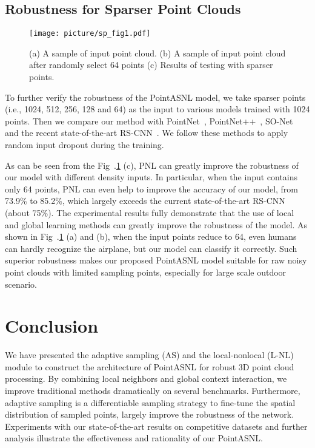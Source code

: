 \documentclass[10pt,twocolumn,letterpaper]{article}
\begin{document}
	\subsection{Robustness for Sparser Point Clouds}
	\begin{figure}[!tbp]
		\begin{center}
			\texttt{[image: picture/sp\_fig1.pdf]}
		\end{center}
		\caption{ { (a) A sample of input point cloud. (b)  A sample of input point cloud after randomly select 64 points (c) Results of testing with sparser points}. }
		\label{fig:sp_fig1}
		\vspace{-0.4cm}
	\end{figure}
	To further verify the robustness of the PointASNL model, we take sparser points (i.e., 1024, 512, 256, 128 and 64) as the input to various models trained with 1024 points. Then we compare our method with PointNet~\cite{pointnet}, PointNet++~\cite{pointnet2}, SO-Net~\cite{So-net} and the recent state-of-the-art RS-CNN~\cite{rscnn}. We follow these methods to apply random input dropout during the training.
	
	
	As can be seen from the Fig~.\ref{fig:sp_fig1} (c), PNL can greatly improve the robustness of our model with different density inputs. In particular, when the input contains only 64 points, PNL can even help to improve the accuracy of our model, from 73.9\% to 85.2\%, which largely exceeds the current state-of-the-art RS-CNN~\cite{rscnn} (about 75\%). The experimental results fully demonstrate that the use of local and global learning methods can greatly improve the robustness of the model.  As shown in Fig~.\ref{fig:sp_fig1} (a) and (b), when the input points reduce to 64, even humans can hardly recognize the airplane, but our model can classify it correctly. Such superior robustness makes our proposed PointASNL model suitable for raw noisy point clouds with limited sampling points, especially for large scale outdoor scenario.
	
	
	
\section{Conclusion}
We have presented the adaptive sampling (AS) and the local-nonlocal (L-NL) module to construct the architecture of PointASNL for robust 3D point cloud processing. By combining local neighbors and global context interaction, we improve traditional methods dramatically on several benchmarks. Furthermore, adaptive sampling is a differentiable sampling strategy to fine-tune the spatial distribution of sampled points, largely improve the robustness of the network. Experiments with our state-of-the-art results on competitive datasets and further analysis illustrate the effectiveness and rationality of our PointASNL.\\
	
\end{document}
